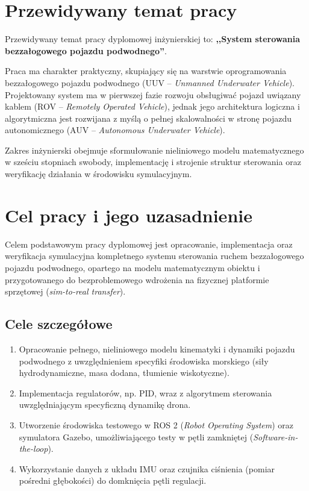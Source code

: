\section{Przewidywany temat pracy}
Przewidywany temat pracy dyplomowej inżynierskiej to: \textbf{,,System sterowania bezzałogowego pojazdu podwodnego''}.

Praca ma charakter praktyczny, skupiający się na warstwie oprogramowania bezzałogowego pojazdu podwodnego (UUV -- \emph{Unmanned Underwater Vehicle}). Projektowany system ma w pierwszej fazie rozwoju obsługiwać pojazd uwiązany kablem (ROV -- \emph{Remotely Operated Vehicle}), jednak jego architektura logiczna i algorytmiczna jest rozwijana z myślą o pełnej skalowalności w stronę pojazdu autonomicznego (AUV -- \emph{Autonomous Underwater Vehicle}). 

Zakres inżynierski obejmuje sformułowanie nieliniowego modelu matematycznego w sześciu stopniach swobody, implementację i strojenie struktur sterowania oraz weryfikację działania w środowisku symulacyjnym.

\section{Cel pracy i jego uzasadnienie}

Celem podstawowym pracy dyplomowej jest opracowanie, implementacja oraz weryfikacja symulacyjna kompletnego systemu sterowania ruchem bezzałogowego pojazdu podwodnego, opartego na modelu matematycznym obiektu i przygotowanego do bezproblemowego wdrożenia na fizycznej platformie sprzętowej (\emph{sim-to-real transfer}).

\subsection{Cele szczegółowe}
\begin{enumerate}
    \item Opracowanie pełnego, nieliniowego modelu kinematyki i dynamiki pojazdu podwodnego z uwzględnieniem specyfiki środowiska morskiego (siły hydrodynamiczne, masa dodana, tłumienie wiskotyczne).
    \item Implementacja regulatorów, np. PID, wraz z algorytmem sterowania uwzględniającym specyficzną dynamikę drona.
    \item Utworzenie środowiska testowego w ROS 2 (\emph{Robot Operating System}) oraz symulatora Gazebo, umożliwiającego testy w pętli zamkniętej (\emph{Software-in-the-loop}).
    \item Wykorzystanie danych z układu IMU oraz czujnika ciśnienia (pomiar pośredni głębokości) do domknięcia pętli regulacji.
\end{enumerate}

